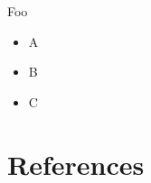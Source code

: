 \documentclass[10pt, t, aspectratio = 1610]{beamer}
\begin{document}

\begin{frame}{Foo}

\begin{itemize}
  \item A
  \item B
  \item C
\end{itemize}

\end{frame} 


\section{References}
\label{ref}


\begin{frame}

\RaggedRight
\small


\end{frame}

\end{document}
